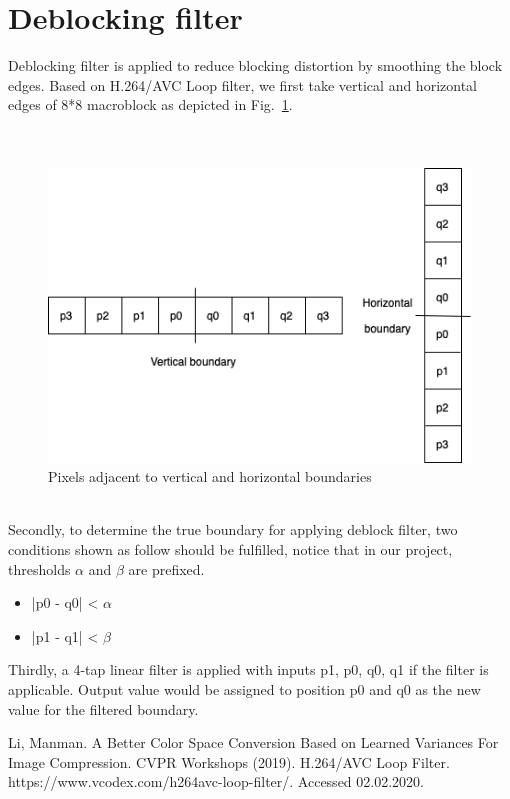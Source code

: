 \documentclass[twocolumn]{article}  %
\begin{document}
\section{Deblocking filter}
Deblocking filter is applied to reduce blocking distortion by smoothing the block edges. Based on H.264/AVC Loop filter\cite{deblock}, we first take vertical and horizontal edges of 8*8 macroblock as depicted in Fig.~\ref{fig:0}. \\
\\
\\
\begin{figure}[h]
\centering
\includegraphics[scale=0.45]{boundary.png}
\caption{Pixels adjacent to vertical and horizontal boundaries}
\label{fig:0}
\end{figure}\\
Secondly, to determine the true boundary for applying deblock filter, two conditions shown as follow should be fulfilled, notice that in our project, thresholds $\alpha$ and $\beta$ are prefixed.
\begin{itemize}
\item |p0 - q0| < $\alpha$
\item |p1 - q1| < $\beta$
\end{itemize}
Thirdly, a 4-tap linear filter is applied with inputs p1, p0, q0, q1 if the filter is applicable. Output value would be assigned to position p0 and q0 as the new value for the filtered boundary. 




\begin{thebibliography}{50} %
Li, Manman.  A Better Color Space Conversion Based on Learned Variances For Image Compression. CVPR Workshops (2019).
H.264/AVC Loop Filter. https://www.vcodex.com/h264avc-loop-filter/. Accessed 02.02.2020.
\end{thebibliography}
\end{document}
